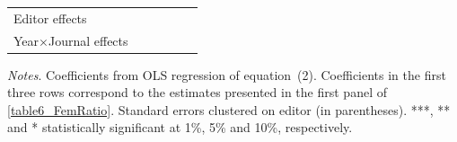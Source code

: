 \begin{table}
\begin{threeparttable}
\begin{tabular}{p{3cm}S@{}S@{}S@{}S@{}S@{}}
            \midrule
            Editor effects        &           {}   &           {}   &           {}   &           {}   &           {}   \\
            Year\(\times\)Journal effects          &           {}   &           {}   &           {}   &           {}   &           {}   \\
            \bottomrule
        \end{tabular}
        \begin{tablenotes}
            \tiny
            \item \textit{Notes}. Coefficients from OLS regression of equation~(2). Coefficients in the first three rows correspond to the estimates presented in the first panel of \autoref{table6_FemRatio}. Standard errors clustered on editor (in parentheses). ***, ** and * statistically significant at 1\%, 5\% and 10\%, respectively.
        \end{tablenotes}
    \end{threeparttable}
\end{table}